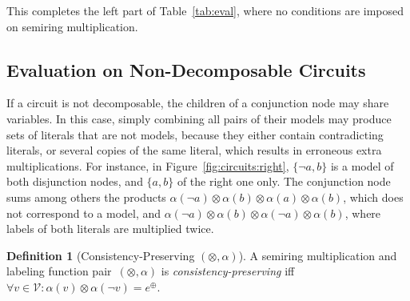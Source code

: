 \documentclass{article}
\theoremstyle{plain}
\theoremstyle{definition}
\newtheorem{definition}{Definition}
\begin{document}
This completes the left part of Table~\ref{tab:eval}, where no
conditions are imposed on semiring multiplication.

\subsection{Evaluation on Non-Decomposable Circuits}\label{sec:nondecomposable}
If a circuit is not
decomposable, the children of a conjunction node may share
variables. In this case, 
simply combining all pairs of their models may
produce sets of literals that are not models, because they either contain
contradicting literals, or several copies of the
same literal, which results in erroneous extra multiplications. For
instance, in Figure~\ref{fig:circuits:right}, $\{\neg
a,b\}$ is a model of both disjunction nodes, and $\{a,b\}$ of the
right one only. The conjunction node sums among others the products
$\alpha(\neg a)\otimes\alpha(b)\otimes\alpha(a)\otimes\alpha(b)$,
which does not correspond to a model, and 
$\alpha(\neg a)\otimes\alpha(b)\otimes\alpha(\neg a)\otimes\alpha(b)$,
where labels of both literals are multiplied twice.
\begin{definition}[Consistency-Preserving $(\otimes,\alpha)$]\label{def:cp}
  A semiring multiplication and labeling function pair~$(\otimes,\alpha)$ is 
  \emph{consistency-preserving} iff $\forall v \in
  \mathcal{V}: \alpha(v) \otimes \alpha(\neg v) = e^{\oplus}$. 
\end{definition}
\end{document}
